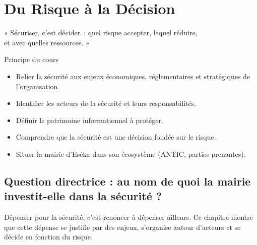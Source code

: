 
\chapter{Du Risque à la Décision}
\label{chap:enjeux}

\epigraph{%
    « Sécuriser, c'est décider~: quel risque accepter, lequel réduire,\\
    et avec quelles ressources. »%
}{Principe du cours}


\begin{boxobjectifs}
\begin{itemize}
    \item Relier la sécurité aux enjeux économiques, réglementaires et
          stratégiques de l'organisation.
    \item Identifier les acteurs de la sécurité et leurs responsabilités.
    \item Définir le patrimoine informationnel à protéger.
    \item Comprendre que la sécurité est une décision fondée sur le risque.
    \item Situer la mairie d'Eséka dans son écosystème (ANTIC, parties
          prenantes).
\end{itemize}
\end{boxobjectifs}

\bigskip

\section*{Question directrice : au nom de quoi la mairie investit-elle dans la sécurité ?}

Dépenser pour la sécurité, c'est renoncer à dépenser ailleurs. Ce chapitre
montre que cette dépense se justifie par des enjeux, s'organise autour
d'acteurs et se décide en fonction du risque.

